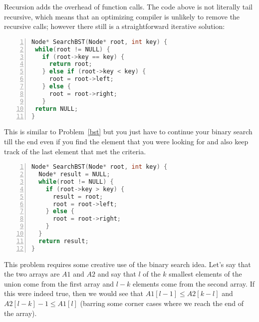 Recursion adds the overhead of function calls. 
The code above is not literally tail recursive, which means
that an optimizing compiler is unlikely to remove the recursive calls;
however there still is a straightforward iterative solution:
\begin{lstlisting}[basicstyle=\footnotesize,numbers=left,breaklines=true,language=C++]
Node* SearchBST(Node* root, int key) {
 while(root != NULL) {
   if (root->key == key) {
     return root;
   } else if (root->key < key) {
     root = root->left;
   } else {
     root = root->right;
   }
 return NULL;
}
\end{lstlisting}


This is similar to Problem~\ref{bst} but you just have to
continue your binary search till the end even if you find the element
that you were looking for and also keep track of the last element
that met the criteria.
\begin{lstlisting}[basicstyle=\footnotesize,numbers=left,breaklines=true,language=C++]
Node* SearchBST(Node* root, int key) {
  Node* result = NULL;
  while(root != NULL) {
    if (root->key > key) {
      result = root;
      root = root->left;
    } else {
      root = root->right;
    }
  }
  return result;
}
\end{lstlisting}

This problem requires some creative use of the binary search
idea. Let's say that the two arrays are $A1$ and $A2$ and say that $l$ of the $k$ smallest elements of the union
come from the first array and $l-k$ elements come from the second array.
If this were indeed true, then we would see that $A1[l-1] \le A2[k-l]$
and $A2[l-k]-1 \le A1[l]$ (barring some corner cases where we reach
the end of the array).

